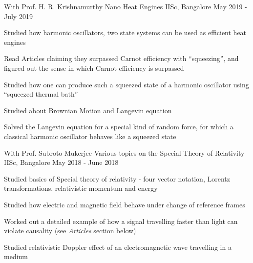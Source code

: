 

\begin{cventries}

  \cventry
    {With Prof. H. R. Krishnamurthy} %
    {Nano Heat Engines} %
    {IISc, Bangalore} %
    {May 2019 - July 2019} %
    {
      \begin{cvitems} %
        \item {Studied how harmonic oscillators, two state systems can be used as efficient heat engines}
        \item {Read Articles claiming they surpassed Carnot efficiency with ``squeezing'', and figured out the sense in which Carnot efficiency is surpassed}
        \item {Studied how one can produce such a squeezed state of a harmonic oscillator using ``squeezed thermal bath''}
        \item {Studied about Brownian Motion and Langevin equation}
        \item {Solved the Langevin equation for a special kind of random force, for which a classical harmonic oscillator behaves like a squeezed state}
      \end{cvitems}
    }

   \cventry
  {With Prof. Subroto Mukerjee} %
  {Various topics on the Special Theory of Relativity} %
  {IISc, Bangalore} %
  {May 2018 - June 2018} %
  {
  	\begin{cvitems} %
  		\item {Studied basics of Special theory of relativity - four vector notation, Lorentz transformations, relativistic momentum and energy}
  		\item {Studied how electric and magnetic field behave under change of reference frames}
  		\item {Worked out a detailed example of how a signal travelling faster than light can violate causality (see \textit{Articles} section below)}
  		\item {Studied relativistic Doppler effect of an electromagnetic wave travelling in a medium}
  	\end{cvitems}
  }

\end{cventries}
